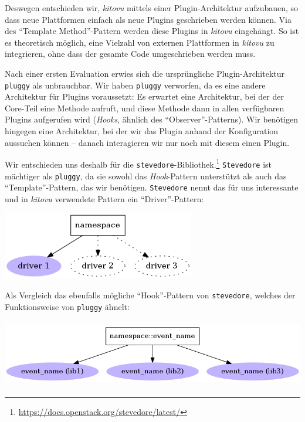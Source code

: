 \documentclass[a4paper]{article}
\begin{document}
Deswegen entschieden wir, \emph{kitovu} mittels einer Plugin-Architektur aufzubauen, so dass neue Plattformen einfach als neue Plugins geschrieben werden können. Via des ``Template Method''-Pattern werden diese Plugins in \emph{kitovu} eingehängt. So ist es theoretisch möglich, eine Vielzahl von externen Plattformen in \emph{kitovu} zu integrieren, ohne dass der gesamte Code umgeschrieben werden muss.

Nach einer ersten Evaluation erwies sich die ursprüngliche Plugin-Architektur \verb|pluggy| als unbrauchbar. Wir haben \verb|pluggy| verworfen, da es eine andere Architektur für Plugins
voraussetzt: Es erwartet eine Architektur, bei der der
Core-Teil eine Methode aufruft, und diese Methode dann in allen verfügbaren
Plugins aufgerufen wird (\emph{Hooks}, ähnlich des ``Observer''-Patterns). Wir benötigen hingegen eine Architektur, bei der wir das Plugin anhand der Konfiguration aussuchen können -- danach interagieren wir nur noch mit diesem einen Plugin.

Wir entschieden uns deshalb für die \verb|stevedore|-Bibliothek.\footnote{\url{https://docs.openstack.org/stevedore/latest/}} \verb|Stevedore| ist mächtiger als \verb|pluggy|, da sie sowohl das \emph{Hook}-Pattern unterstützt als auch das ``Template''-Pattern, das wir benötigen. \verb|Stevedore| nennt das für uns interessante und in \emph{kitovu} verwendete Pattern ein ``Driver''-Pattern: \\

\begin{center}
	\includegraphics[height=8em]{img/stevedore_driver.png}
\end{center}

Als Vergleich das ebenfalls mögliche ``Hook''-Pattern von \verb|stevedore|, welches der
Funktionsweise von \verb|pluggy| ähnelt:

\begin{center}
	\includegraphics[height=8em]{img/stevedore_hooks.png}
\end{center}
\end{document}
